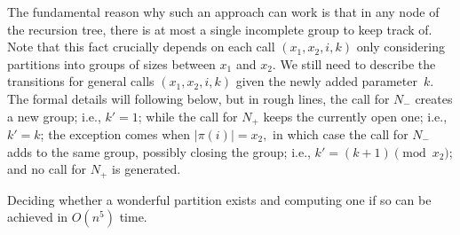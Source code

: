 \documentclass[a4paper,UKenglish,cleveref, autoref, thm-restate]{lipics-v2021}
\newcommand{\modulus}[1]{\vert #1 \vert}
\begin{document}
The fundamental reason why such an approach can work is that in any node of the recursion tree, there is at most a single incomplete group to keep track of. Note that this fact crucially depends on each call $(x_1, x_2, i, k)$ only considering partitions into groups of sizes between $x_1$ and $x_2.$ We still need to describe the transitions for general calls $(x_1, x_2, i, k)$ given the newly added parameter~$k$. The formal details will following below, but in rough lines, the call for $N_{-}$ creates a new group; i.e., $k' = 1$; while the call for $N_{+}$ keeps the currently open one; i.e., $k' = k$; the exception comes when $\modulus{\pi(i)} = x_2,$ in which case the call for $N_{-}$ adds to the same group, possibly closing the group; i.e., $k' = (k + 1) \pmod{x_2}$; and no call for $N_{+}$ is generated.

\begin{theorem}  \label{thm:hiking-is-poly-time} Deciding whether a wonderful partition exists and computing one if so can be achieved in $O(n^5)$ time.
\end{theorem}
\end{document}
